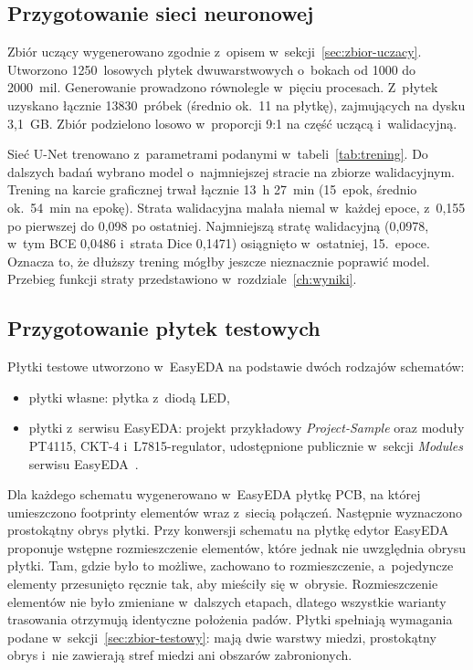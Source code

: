 \subsection{Przygotowanie sieci neuronowej}
\label{sec:exp-trening}

Zbiór uczący wygenerowano zgodnie z~opisem w~sekcji~\ref{sec:zbior-uczacy}.
Utworzono 1250~losowych płytek dwuwarstwowych o~bokach od 1000 do
2000~mil. Generowanie prowadzono równolegle w~pięciu procesach.
Z~płytek uzyskano łącznie 13830~próbek (średnio ok.~11 na płytkę),
zajmujących na dysku 3,1~GB. Zbiór podzielono losowo w~proporcji 9:1 na
część uczącą i~walidacyjną.

Sieć U-Net trenowano z~parametrami podanymi w~tabeli~\ref{tab:trening}.
Do dalszych badań wybrano model o~najmniejszej stracie na zbiorze
walidacyjnym. Trening na karcie graficznej trwał łącznie 13~h 27~min
(15~epok, średnio ok.~54~min na epokę). Strata walidacyjna malała niemal
w~każdej epoce, z~0,155 po pierwszej do 0,098 po ostatniej. Najmniejszą
stratę walidacyjną (0,0978, w~tym BCE 0,0486 i~strata Dice 0,1471)
osiągnięto w~ostatniej, 15.~epoce. Oznacza to, że dłuższy trening mógłby
jeszcze nieznacznie poprawić model.
Przebieg funkcji straty przedstawiono w~rozdziale~\ref{ch:wyniki}.

\subsection{Przygotowanie płytek testowych}
\label{sec:exp-plytki}

Płytki testowe utworzono w~EasyEDA na podstawie dwóch rodzajów schematów:
\begin{itemize}
  \item płytki własne: płytka z~diodą LED,
  \item płytki z~serwisu EasyEDA: projekt przykładowy \emph{Project-Sample}
    oraz moduły PT4115, CKT-4 i~L7815-regulator, udostępnione publicznie
    w~sekcji \emph{Modules} serwisu EasyEDA~\cite{EasyEDA_ProjectSample}.
\end{itemize}

Dla każdego schematu wygenerowano w~EasyEDA płytkę PCB, na której
umieszczono footprinty elementów wraz z~siecią połączeń. Następnie
wyznaczono prostokątny obrys płytki. Przy konwersji schematu na płytkę
edytor EasyEDA proponuje wstępne rozmieszczenie elementów, które jednak
nie uwzględnia obrysu płytki. Tam, gdzie było to możliwe, zachowano to
rozmieszczenie, a~pojedyncze elementy przesunięto ręcznie tak, aby
mieściły się w~obrysie. Rozmieszczenie elementów nie było zmieniane w~dalszych etapach, 
dlatego wszystkie warianty trasowania otrzymują identyczne położenia padów. 
Płytki spełniają wymagania podane w~sekcji~\ref{sec:zbior-testowy}:
mają dwie warstwy miedzi, prostokątny obrys i~nie zawierają 
stref miedzi ani obszarów zabronionych.

